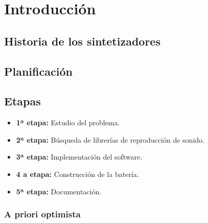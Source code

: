 
\chapter{Introducción} %
\label{cha:Introduccion}

    \section{Historia de los sintetizadores} %
    \label{sec:HistoriaDeLosSintetizadores}



    \section{Planificación} %
    \label{sec:Planificacion}

        \section{Etapas} %
        \label{sec:Etapas}

            \begin{itemize}
                \item \textbf{1ª etapa:} Estudio del problema.

                \item \textbf{2ª etapa:} Búsqueda de librerías de reproducción de sonido.

                \item \textbf{3ª etapa:} Implementación del software.

                \item \textbf{4 a etapa:} Construcción de la batería.

                \item \textbf{5ª etapa:} Documentación.
            \end{itemize}
            


        \subsection{A priori optimista} %
        \label{sub:APrioriOptimista}

